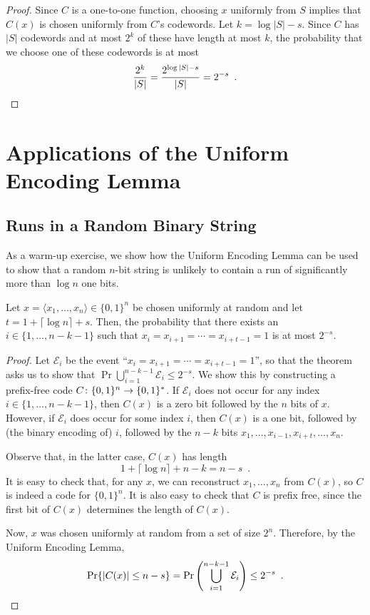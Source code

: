 \documentclass[lotsofwhite]{patmorin}
\begin{document}
\begin{proof}
  Since $C$ is a one-to-one function, choosing $x$ uniformly from $S$
  implies that $C(x)$ is chosen uniformly from $C$'s codewords. Let
  $k=\log|S|-s$. Since $C$ has $|S|$ codewords and at most $2^{k}$ of these
  have length at most $k$, the probability that we choose one of these 
  codewords is at most
  \[   \frac{2^k}{|S|} = \frac{2^{\log|S|-s}}{|S|} = 2^{-s} \enspace . \qedhere \]
\end{proof}

\section{Applications of the Uniform Encoding Lemma}


\subsection{Runs in a Random Binary String}

As a warm-up exercise, we show how the Uniform Encoding Lemma can be
used to show that a random $n$-bit string is unlikely to contain a run
of significantly more than $\log n$ one bits.

\begin{thm}
  Let $x=\langle x_1,\ldots,x_n\rangle\in\{0,1\}^n$ be chosen
  uniformly at random and let $t=1+\lceil\log n\rceil + s$. Then, the
  probability that there exists an $i\in\{1,\ldots,n-k-1\}$ such that
  $x_i=x_{i+1}=\cdots=x_{i+t-1}=1$ is at most $2^{-s}$.
\end{thm}

\begin{proof}
  Let $\mathcal{E}_i$ be the event ``$x_i=x_{i+1}=\cdots=x_{i+t-1}=1$'',
  so that the theorem asks us to show that $\Pr \bigcup_{i=1}^{n-k-1}
  \mathcal{E}_i \le 2^{-s}$.  We show this by constructing a prefix-free
  code $C\colon\{0,1\}^n\to\{0,1\}^*$.  If $\mathcal{E}_i$ does not
  occur for any index $i\in\{1,\ldots,n-k-1\}$, then $C(x)$ is a zero
  bit followed by the $n$ bits of $x$.  However, if $\mathcal{E}_i$
  does occur for some index $i$, then $C(x)$ is a one bit, followed
  by (the binary encoding of) $i$, followed by the $n-k$ bits
  $x_1,\ldots,x_{i-1},x_{i+t},\ldots,x_n$.

  Observe that, in the latter case, $C(x)$ has length 
  \[
      1 + \lceil\log n\rceil + n - k = n-s \enspace .
  \]
  It is easy to check that, for any $x$, we can reconstruct
  $x_1,\ldots,x_n$ from $C(x)$, so $C$ is indeed a code for $\{0,1\}^n$.
  It is also easy to check that $C$ is prefix free, since the first bit
  of $C(x)$ determines the length of $C(x)$.

  Now, $x$ was chosen uniformly at random from a set of size $2^{n}$.
  Therefore, by the Uniform Encoding Lemma, 
  \[
      \Pr\{|C(x)|\le n-s\} = \Pr\left(\bigcup_{i=1}^{n-k-1} \mathcal{E}_i\right) \le 2^{-s} \enspace . \qedhere \]
\end{proof}
\end{document}
